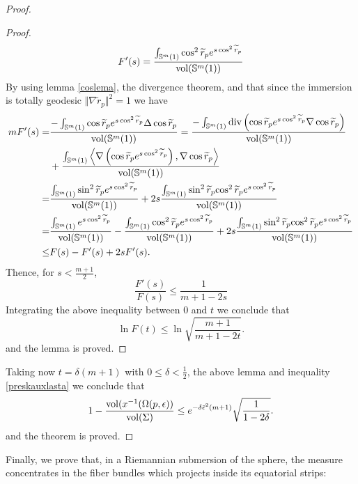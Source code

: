 \documentclass{amsart}
\theoremstyle{definition}
\theoremstyle{remark}
\begin{document}
\begin{proof}
\begin{proof}
    $$
F'(s)=\frac{\int_{\mathbb{S}^m(1)}\cos^2\widetilde{r}_pe^{s \cos^2\widetilde{r}_p}}{{\rm vol}(\mathbb{S}^m(1))}
    $$
 By using lemma \ref{coslema}, the divergence theorem, and that since the immersion is totally geodesic $\Vert \nabla\widetilde{r}_p\Vert^2=1$ we have 
 $$
\begin{aligned}
mF'(s)=&\frac{-\int_{\mathbb{S}^m(1)}\cos\widetilde{r}_pe^{s \cos^2\widetilde{r}_p}\Delta \cos\widetilde{r}_p}{{\rm vol}(\mathbb{S}^m(1))}
=\frac{-\int_{\mathbb{S}^m(1)}{\rm div}\left(\cos\widetilde{r}_pe^{s \cos^2\widetilde{r}_p}\nabla \cos\widetilde{r}_p\right)}{{\rm vol}(\mathbb{S}^m(1))}\\&+\frac{\int_{\mathbb{S}^m(1)}\left\langle\nabla \left(\cos\widetilde{r}_pe^{s \cos^2\widetilde{r}_p}\right),\nabla \cos\widetilde{r}_p\right\rangle}{{\rm vol}(\mathbb{S}^m(1))}\\
=&\frac{\int_{\mathbb{S}^m(1)}\sin^2\widetilde{r}_pe^{s \cos^2\widetilde{r}_p}}{{\rm vol}(\mathbb{S}^m(1))}+2s\frac{\int_{\mathbb{S}^m(1)}\sin^2\widetilde{r}_p{ \cos^2\widetilde{r}_p}e^{s \cos^2\widetilde{r}_p}}{{\rm vol}(\mathbb{S}^m(1))}\\
=&\frac{\int_{\mathbb{S}^m(1)}e^{s \cos^2\widetilde{r}_p}}{{\rm vol}(\mathbb{S}^m(1))}-\frac{\int_{\mathbb{S}^m(1)}\cos^2\widetilde{r}_pe^{s \cos^2\widetilde{r}_p}}{{\rm vol}(\mathbb{S}^m(1))}+2s\frac{\int_{\mathbb{S}^m(1)}\sin^2\widetilde{r}_p{ \cos^2\widetilde{r}_p}e^{s \cos^2\widetilde{r}_p}}{{\rm vol}(\mathbb{S}^m(1))}\\
\leq & F(s)-F'(s)+2sF'(s).
    \end{aligned}
 $$
 Thence, for $s<\frac{m+1}{2}$,
 $$
\frac{F'(s)}{F(s)}\leq \frac{1}{m+1-2s}
 $$
 Integrating the above inequality between $0$ and $t$ we conclude that
 $$
\ln F(t)\leq \ln \sqrt{\frac{m+1}{m+1-2t}}.
 $$
 and the lemma is proved.
\end{proof}
Taking now $t=\delta(m+1)$ with $0\leq \delta<\frac{1}{2}$, the above lemma and inequality \eqref{preskauxlasta} we conclude that
\begin{equation}\label{lasta}
     1-\frac{{\rm vol}(x^{-1}(\Omega(p,\epsilon))}{{\rm vol}(\Sigma)}\leq e^{-\delta\bar\epsilon^2(m+1)}\sqrt{\frac{1}{1-2\delta}}.
\end{equation}
and the theorem is proved.\end{proof}

Finally, we prove that, in a Riemannian submersion of the sphere, the measure concentrates in the fiber bundles which projects inside its equatorial strips:
\end{document}
